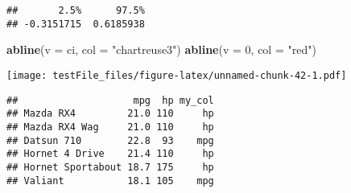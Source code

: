 \documentclass[]{article}
\newenvironment{Shaded}{\begin{snugshade}}{\end{snugshade}}
\newcommand{\CommentTok}[1]{\textcolor[rgb]{0.56,0.35,0.01}{\textit{#1}}}
\newcommand{\ControlFlowTok}[1]{\textcolor[rgb]{0.13,0.29,0.53}{\textbf{#1}}}
\newcommand{\DataTypeTok}[1]{\textcolor[rgb]{0.13,0.29,0.53}{#1}}
\newcommand{\DecValTok}[1]{\textcolor[rgb]{0.00,0.00,0.81}{#1}}
\newcommand{\KeywordTok}[1]{\textcolor[rgb]{0.13,0.29,0.53}{\textbf{#1}}}
\newcommand{\NormalTok}[1]{#1}
\newcommand{\OperatorTok}[1]{\textcolor[rgb]{0.81,0.36,0.00}{\textbf{#1}}}
\newcommand{\OtherTok}[1]{\textcolor[rgb]{0.56,0.35,0.01}{#1}}
\newcommand{\StringTok}[1]{\textcolor[rgb]{0.31,0.60,0.02}{#1}}
\begin{document}
\begin{verbatim}
##       2.5%      97.5% 
## -0.3151715  0.6185938
\end{verbatim}

\begin{Shaded}
\begin{Highlighting}[]
\KeywordTok{abline}\NormalTok{(}\DataTypeTok{v =}\NormalTok{ ci, }\DataTypeTok{col =} \StringTok{"chartreuse3"}\NormalTok{)}
\KeywordTok{abline}\NormalTok{(}\DataTypeTok{v =} \DecValTok{0}\NormalTok{, }\DataTypeTok{col =} \StringTok{"red"}\NormalTok{)}
\end{Highlighting}
\end{Shaded}

\texttt{[image: testFile\_files/figure-latex/unnamed-chunk-42-1.pdf]}

\begin{Shaded}
\end{Shaded}

\begin{verbatim}
##                    mpg  hp my_col
## Mazda RX4         21.0 110     hp
## Mazda RX4 Wag     21.0 110     hp
## Datsun 710        22.8  93    mpg
## Hornet 4 Drive    21.4 110     hp
## Hornet Sportabout 18.7 175     hp
## Valiant           18.1 105    mpg
\end{verbatim}

\begin{Shaded}
\end{Shaded}

\begin{Shaded}
\end{Shaded}
\end{document}
